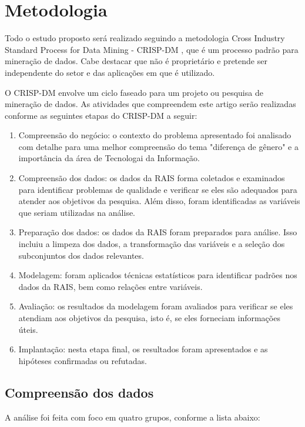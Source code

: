 \section{Metodologia}

Todo o estudo proposto será realizado seguindo a metodologia Cross Industry Standard Process for Data Mining - CRISP-DM \cite{chapman2000crisp}, que é um processo padrão para mineração de dados.  Cabe destacar que não é proprietário e pretende ser independente do setor e das aplicações em que é utilizado.

O CRISP-DM envolve um ciclo faseado para um projeto ou pesquisa de mineração de dados. As atividades que compreendem este artigo serão realizadas conforme as seguintes etapas do CRISP-DM a seguir:

\begin{enumerate}
	\item Compreensão do negócio: o contexto do problema apresentado foi analisado com detalhe para uma melhor compreensão do tema "diferença de gênero" e a importância da área de Tecnologai da Informação.
	\item Compreensão dos dados: os dados da RAIS forma coletados e examinados para identificar problemas de qualidade e verificar se eles são adequados para atender aos objetivos da pesquisa. Além disso, foram identificadas as variáveis que seriam utilizadas na análise.
	\item Preparação dos dados: os dados da RAIS foram preparados para análise. Isso incluiu a limpeza dos dados, a transformação das variáveis e a seleção dos subconjuntos dos dados relevantes. 
	\item Modelagem: foram aplicados técnicas estatísticos para identificar padrões nos dados da RAIS, bem como relações entre variáveis.
	\item Avaliação: os resultados da modelagem foram avaliados para verificar se eles atendiam aos objetivos da pesquisa, isto é, se eles forneciam informações úteis.
	\item Implantação: nesta etapa final, os resultados foram apresentados e as hipóteses confirmadas ou refutadas. 
\end{enumerate}
	      	      	      
\subsection{Compreensão dos dados}
	      	      	    
A análise foi feita com foco em quatro grupos, conforme a lista abaixo:

